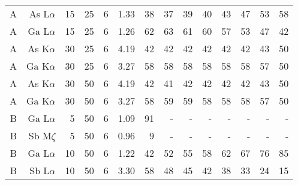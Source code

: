 \begin{table}[phtb]
\begin{center}
\begin{tabular}{rrrrrrrrrrrrrr}
            A            & As L$\alpha$  & 15             & 25             & 6           & 1.33              & 38             & 37           & 39            & 40             & 43             & 47             & 53            & 58             \\
            A            & Ga L$\alpha$  & 15             & 25             & 6           & 1.26              & 62             & 63           & 61            & 60             & 57             & 53             & 47            & 42             \\
            A            & As K$\alpha$  & 30             & 25             & 6           & 4.19              & 42             & 42           & 42            & 42             & 42             & 42             & 43            & 50             \\
            A            & Ga K$\alpha$  & 30             & 25             & 6           & 3.27              & 58             & 58           & 58            & 58             & 58             & 58             & 57            & 50             \\
            A            & As K$\alpha$  & 30             & 50             & 6           & 4.19              & 42             & 41           & 42            & 42             & 42             & 42             & 43            & 50             \\
            A            & Ga K$\alpha$  & 30             & 50             & 6           & 3.27              & 58             & 59           & 59            & 58             & 58             & 58             & 57            & 50             \\
            \hline
            B            & Ga L$\alpha$  & 5              & 50             & 6           & 1.09              & 91             & -            & -             & -              & -              & -              & -             & -              \\
            B            & Sb M$\zeta$    & 5              & 50             & 6           & 0.96              & 9              & -            & -             & -              & -              & -              & -             & -              \\
            B            & Ga L$\alpha$  & 10             & 50             & 6           & 1.22              & 42             & 52           & 55            & 58             & 62             & 67             & 76            & 85             \\
            B            & Sb L$\alpha$  & 10             & 50             & 6           & 3.30              & 58             & 48           & 45            & 42             & 38             & 33             & 24            & 15             \\

\end{tabular}
\end{center}
\end{table}
